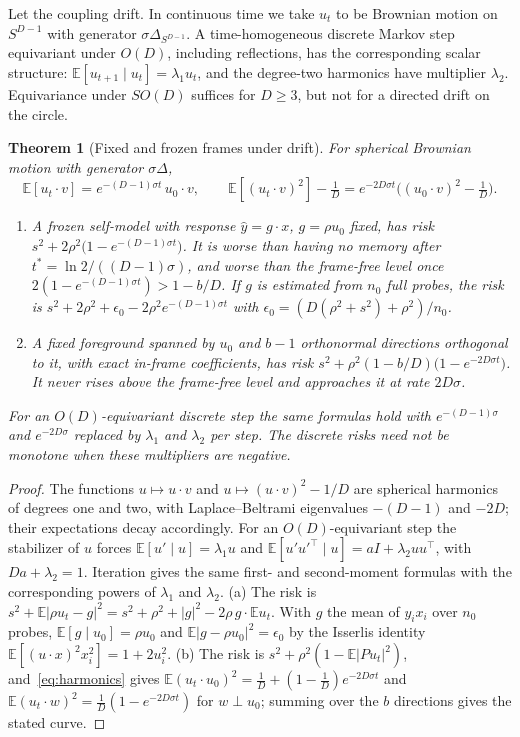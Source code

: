 \documentclass[12pt]{article}
\newtheorem{theorem}{Theorem}
\theoremstyle{definition}
\newcommand{\E}{\mathbb E}
\begin{document}
Let the coupling drift. In continuous time we take $u_t$ to be Brownian motion on $S^{D-1}$ with generator $\sigma\Delta_{S^{D-1}}$. A time-homogeneous discrete Markov step equivariant under $O(D)$, including reflections, has the corresponding scalar structure: $\E[u_{t+1}\mid u_t]=\lambda_1u_t$, and the degree-two harmonics have multiplier $\lambda_2$. Equivariance under $SO(D)$ suffices for $D\ge3$, but not for a directed drift on the circle.

\begin{theorem}[Fixed and frozen frames under drift]
\label{thm:drift}
For spherical Brownian motion with generator $\sigma\Delta$,
\begin{equation}
\label{eq:harmonics}
\E[u_t\cdot v]=e^{-(D-1)\sigma t}\,u_0\cdot v,\qquad
\E[(u_t\cdot v)^2]-\tfrac1D=e^{-2D\sigma t}\bigl((u_0\cdot v)^2-\tfrac1D\bigr).
\end{equation}
\begin{enumerate}
\item[(a)] A frozen self-model with response $\hat y=g\cdot x$, $g=\rho u_0$ fixed, has risk $s^2+2\rho^2\bigl(1-e^{-(D-1)\sigma t}\bigr)$. It is worse than having no memory after $t^*=\ln2/((D-1)\sigma)$, and worse than the frame-free level once $2(1-e^{-(D-1)\sigma t})>1-b/D$. If $g$ is estimated from $n_0$ full probes, the risk is $s^2+2\rho^2+\epsilon_0-2\rho^2e^{-(D-1)\sigma t}$ with $\epsilon_0=(D(\rho^2+s^2)+\rho^2)/n_0$.
\item[(b)] A fixed foreground spanned by $u_0$ and $b-1$ orthonormal directions orthogonal to it, with exact in-frame coefficients, has risk $s^2+\rho^2(1-b/D)\bigl(1-e^{-2D\sigma t}\bigr)$. It never rises above the frame-free level and approaches it at rate $2D\sigma$.
\end{enumerate}
For an $O(D)$-equivariant discrete step the same formulas hold with $e^{-(D-1)\sigma}$ and $e^{-2D\sigma}$ replaced by $\lambda_1$ and $\lambda_2$ per step. The discrete risks need not be monotone when these multipliers are negative.
\end{theorem}

\begin{proof}
The functions $u\mapsto u\cdot v$ and $u\mapsto(u\cdot v)^2-1/D$ are spherical harmonics of degrees one and two, with Laplace--Beltrami eigenvalues $-(D-1)$ and $-2D$; their expectations decay accordingly. For an $O(D)$-equivariant step the stabilizer of $u$ forces $\E[u'\mid u]=\lambda_1u$ and $\E[u'u'^{\top}\mid u]=aI+\lambda_2uu^{\top}$, with $Da+\lambda_2=1$. Iteration gives the same first- and second-moment formulas with the corresponding powers of $\lambda_1$ and $\lambda_2$. (a) The risk is $s^2+\E|\rho u_t-g|^2=s^2+\rho^2+|g|^2-2\rho\,g\cdot\E u_t$. With $g$ the mean of $y_ix_i$ over $n_0$ probes, $\E[g\mid u_0]=\rho u_0$ and $\E|g-\rho u_0|^2=\epsilon_0$ by the Isserlis identity $\E[(u\cdot x)^2x_i^2]=1+2u_i^2$. (b) The risk is $s^2+\rho^2(1-\E|Pu_t|^2)$, and~\eqref{eq:harmonics} gives $\E(u_t\cdot u_0)^2=\tfrac1D+(1-\tfrac1D)e^{-2D\sigma t}$ and $\E(u_t\cdot w)^2=\tfrac1D(1-e^{-2D\sigma t})$ for $w\perp u_0$; summing over the $b$ directions gives the stated curve.
\end{proof}
\end{document}
